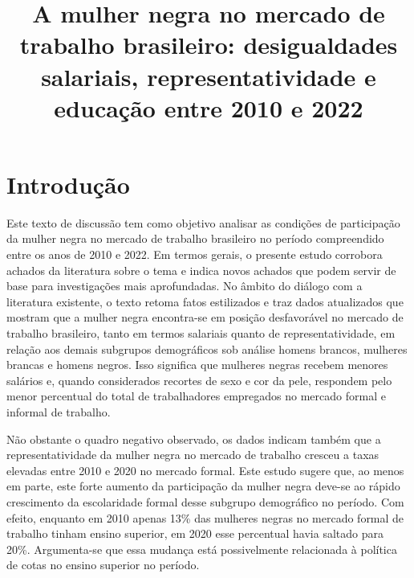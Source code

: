 \documentclass[12pt]{article}
\begin{document}
 

\linespread{1.1}

\title{%
  A mulher negra no mercado de trabalho brasileiro: desigualdades salariais, representatividade e educação entre 2010 e 2022\\
  \vspace{1cm}
}


\maketitle

\clearpage

\thispagestyle{empty}

\thispagestyle{empty}

\section{Introdução}


\par Este texto de discussão tem como objetivo analisar as condições de participação da mulher negra no mercado de trabalho brasileiro no período compreendido entre os anos de 2010 e 2022. Em termos gerais, o presente estudo corrobora achados da literatura sobre o tema e indica novos achados que podem servir de base para investigações mais aprofundadas. No âmbito do diálogo com a literatura existente, o texto retoma fatos estilizados e traz dados atualizados que mostram que a mulher negra encontra-se em posição desfavorável no mercado de trabalho brasileiro, tanto em termos salariais quanto de representatividade, em relação aos demais subgrupos de\-mo\-grá\-fi\-cos sob análise \textemdash homens brancos, mulheres brancas e homens negros. Isso significa que mulheres negras recebem menores salários e, quando considerados recortes de sexo e cor da pele, respondem pelo menor percentual do total de trabalhadores empregados no mercado formal e informal de trabalho. 

\par Não obstante o quadro negativo observado, os dados indicam também que a representatividade da mulher negra no mercado de trabalho cresceu a taxas elevadas entre 2010 e 2020 no mercado formal. Este estudo sugere que, ao menos em parte, este forte aumento da participação da mulher negra deve-se ao rápido crescimento da escolaridade formal desse subgrupo demográfico no período. Com efeito, enquanto em 2010 apenas 13\% das mulheres negras no mercado formal de trabalho tinham ensino superior, em 2020 esse percentual havia saltado para 20\%. Argumenta-se que essa mudança está possivelmente relacionada à política de cotas no ensino superior no período.
\end{document}

